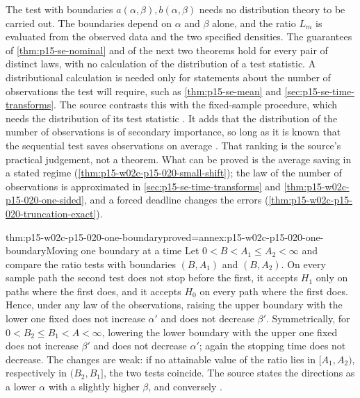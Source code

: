 The test with boundaries \(a(\alpha,\beta),b(\alpha,\beta)\) needs no
distribution theory to be carried out. The boundaries depend on
\(\alpha\) and \(\beta\) alone, and the ratio \(L_m\) is evaluated from
the observed data and the two specified densities. The guarantees of
\cref{thm:p15-se-nominal} and of the next two theorems hold for every
pair of distinct laws, with no calculation of the distribution of a
test statistic. A distributional calculation is needed only for
statements about the number of observations the test will require,
such as \cref{thm:p15-se-mean} and \cref{sec:p15-se-time-transforms}.
The source contrasts this with the fixed-sample procedure, which needs
the distribution of its test statistic
\cite[Introduction, p.~119; Section 3.3, p.~133]{Wald1945SequentialTests}.
It adds that the distribution of the number of observations is of
secondary importance, so long as it is known that the sequential test
saves observations on average \cite[Section 3.3, p.~133]{Wald1945SequentialTests}.
That ranking is the source's practical judgement, not a theorem. What
can be proved is the average saving in a stated regime
(\cref{thm:p15-w02c-p15-020-small-shift}); the law of the number of
observations is approximated in \cref{sec:p15-se-time-transforms} and
\cref{thm:p15-w02c-p15-020-one-sided}, and a forced deadline changes
the errors (\cref{thm:p15-w02c-p15-020-truncation-exact}).

\begin{hbtheorem}{thm:p15-w02c-p15-020-one-boundary}{proved=annex:p15-w02c-p15-020-one-boundary}{Moving one boundary at a time}
Let \(0<B<A_1\leq A_2<\infty\) and compare the ratio tests with
boundaries \((B,A_1)\) and \((B,A_2)\). On every sample path the
second test does not stop before the first, it accepts \(H_1\) only on
paths where the first does, and it accepts \(H_0\) on every path where
the first does. Hence, under any law of the observations, raising the
upper boundary with the lower one fixed does not increase \(\alpha'\)
and does not decrease \(\beta'\).
Symmetrically, for \(0<B_2\leq B_1<A<\infty\), lowering the lower
boundary with the upper one fixed does not increase \(\beta'\) and does
not decrease \(\alpha'\); again the stopping time does not decrease.
The changes are weak: if no attainable value of the ratio lies in
\([A_1,A_2)\), respectively in \((B_2,B_1]\), the two tests coincide.
The source states the directions as a lower \(\alpha\) with a slightly
higher \(\beta\), and conversely
\cite[Section 3.3, p.~131]{Wald1945SequentialTests}.
\end{hbtheorem}

